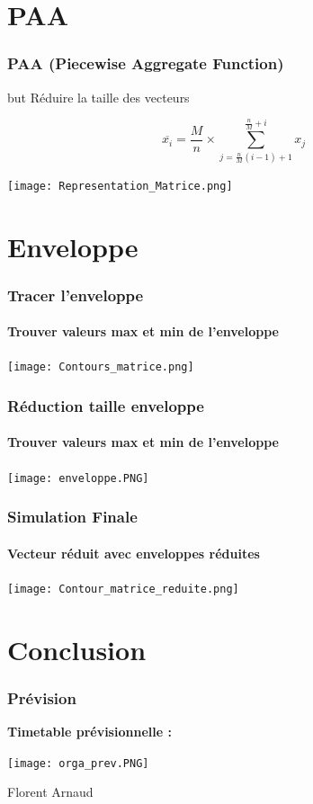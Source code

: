 \documentclass{beamer}
\begin{document}
\section{PAA}
\begin{frame}
	\frametitle{PAA (Piecewise Aggregate Function)}
	\begin{exampleblock}{but}
		Réduire la taille des vecteurs
		
	\end{exampleblock}
	\begin{equation}
		\overline{x_i}=\frac{M}{n}\times \sum_{j=\frac{n}{M}(i-1)+1}^{\frac{n}{M}+i}x_j
	\end{equation}
\end{frame}
\begin{frame}
	\texttt{[image: Representation\_Matrice.png]}
\end{frame}
\section{Enveloppe}
\begin{frame}
	\frametitle{Tracer l'enveloppe}
	\framesubtitle{Trouver valeurs max et min de l'enveloppe}
	\texttt{[image: Contours\_matrice.png]}
\end{frame}
\begin{frame}
	\frametitle{Réduction taille enveloppe}
	\framesubtitle{Trouver valeurs max et min de l'enveloppe}
	\texttt{[image: enveloppe.PNG]}
\end{frame}
\begin{frame}
	\frametitle{Simulation Finale}
	\framesubtitle{Vecteur réduit avec enveloppes réduites}
	\texttt{[image: Contour\_matrice\_reduite.png]}
\end{frame}
\section{Conclusion}
	\begin{frame}
	\frametitle{Prévision}
	\textbf{Timetable prévisionnelle :}
	\begin{center}
		\texttt{[image: orga\_prev.PNG]}
	\end{center}
	\colorbox[HTML]{A9D08E}{\textcolor[HTML]{FFFFFF}{Florent}}
	\colorbox[HTML]{8ea9db}{\textcolor[HTML]{FFFFFF}{Arnaud}}
\end{frame}
\end{document}
